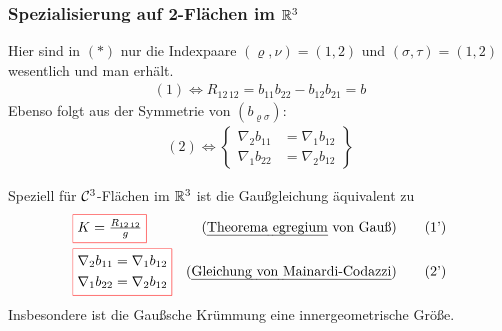 \subsubsection{Spezialisierung auf 2-Flächen im \(\mathbb{R}^3\)}
Hier sind in \((\ast)\) nur die Indexpaare \((\varrho, \nu) = (1,2)\) und \((\sigma,\tau) = (1,2)\) wesentlich und man erhält.
\begin{align*}
 (1) \Leftrightarrow R_{12\,12} = b_{11}b_{22}-b_{12}b_{21} = b
\end{align*}
Ebenso folgt aus der Symmetrie von \((b_{\varrho \sigma})\):
\begin{align*}
 (2) \Leftrightarrow \begin{Bmatrix}
                      \nabla_2 b_{11} &= \nabla_1 b_{12} \\
                      \nabla_1 b_{22} &= \nabla_2 b_{12}
                     \end{Bmatrix}
\end{align*}
\setcounter{folgn}{2}
\begin{folgn}
 Speziell für \(\mathcal{C}^3\)-Flächen im \(\mathbb{R}^3\) ist die Gaußgleichung äquivalent zu
 \begin{align*}
  &\fcolorbox{red}{white}{\(K = \frac{R_{12 \, 12}}{g}\)} &\text{(\uline{Theorema egregium} von Gauß)} \tag {1'} \\
  &\fcolorbox{red}{white}{\(\begin{aligned}
           \nabla_2 b_{11} &= \nabla_1 b_{12} \\
           \nabla_1 b_{22} &= \nabla_2 b_{12}
          \end{aligned}\)} &\text{(\uline{Gleichung von Mainardi-Codazzi})} \tag{2'}
 \end{align*}
 Insbesondere ist die Gaußsche Krümmung eine innergeometrische Größe.
\end{folgn}

